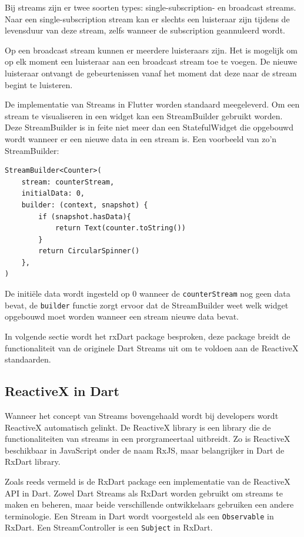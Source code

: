 Bij streams zijn er twee soorten types: single-subscription- en broadcast streams. Naar een single-subscription stream kan er slechts een luisteraar zijn tijdens de levensduur van deze stream, zelfs wanneer de subscription geannuleerd wordt. 

Op een broadcast stream kunnen er meerdere luisteraars zijn. Het is mogelijk om op elk moment een luisteraar aan een broadcast stream toe te voegen. De nieuwe luisteraar ontvangt de gebeurtenissen vanaf het moment dat deze naar de stream begint te luisteren.

De implementatie van Streams in Flutter worden standaard meegeleverd. Om een stream te visualiseren in een widget kan een StreamBuilder gebruikt worden. Deze StreamBuilder is in feite niet meer dan een StatefulWidget die opgebouwd wordt wanneer er een nieuwe data in een stream is.
Een voorbeeld van zo'n StreamBuilder:
\begin{verbatim}
StreamBuilder<Counter>(
    stream: counterStream,
    initialData: 0,
    builder: (context, snapshot) {
        if (snapshot.hasData){
            return Text(counter.toString())
        }
        return CircularSpinner()
    },
)
\end{verbatim}
De initiële data wordt ingesteld op 0 wanneer de \verb|counterStream| nog geen data bevat, de \verb|builder| functie zorgt ervoor dat de StreamBuilder weet welk widget opgebouwd moet worden wanneer een stream nieuwe data bevat.

In volgende sectie wordt het rxDart package besproken, deze package breidt de functionaliteit van de originele Dart Streams uit om te voldoen aan de ReactiveX standaarden.

\subsection*{ReactiveX in Dart}
Wanneer het concept van Streams bovengehaald wordt bij developers wordt ReactiveX automatisch gelinkt. De ReactiveX library is een library die de functionaliteiten van streams in een prorgrameertaal uitbreidt. Zo is ReactiveX beschikbaar in JavaScript onder de naam RxJS, maar belangrijker in Dart de RxDart library.

Zoals reeds vermeld is de RxDart package een implementatie van de ReactiveX API in Dart. Zowel Dart Streams als RxDart worden gebruikt om streams te maken en beheren, maar beide verschillende ontwikkelaars gebruiken een andere terminologie.
Een Stream in Dart wordt voorgesteld als een \verb|Observable| in RxDart. Een StreamController is een \verb|Subject| in RxDart.

